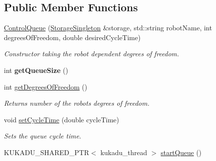 \subsection*{Public Member Functions}
\begin{DoxyCompactItemize}
\item 
\hyperlink{classkukadu_1_1ControlQueue_ae9c6ce0ac682b36829f892d8c3e44977}{Control\+Queue} (\hyperlink{classkukadu_1_1StorageSingleton}{Storage\+Singleton} \&storage, std\+::string robot\+Name, int degrees\+Of\+Freedom, double desired\+Cycle\+Time)
\begin{DoxyCompactList}\small\item\em Constructor taking the robot dependent degrees of freedom. \end{DoxyCompactList}\item 
int {\bfseries get\+Queue\+Size} ()\hypertarget{classkukadu_1_1ControlQueue_a90e78528f686215996715d225c6c4804}{}\label{classkukadu_1_1ControlQueue_a90e78528f686215996715d225c6c4804}

\item 
int \hyperlink{classkukadu_1_1ControlQueue_a809f7cfd97038949139e3b13218738ad}{get\+Degrees\+Of\+Freedom} ()
\begin{DoxyCompactList}\small\item\em Returns number of the robots degrees of freedom. \end{DoxyCompactList}\item 
void \hyperlink{classkukadu_1_1ControlQueue_a5245ff31c7dea26070743d1f6560801c}{set\+Cycle\+Time} (double cycle\+Time)
\begin{DoxyCompactList}\small\item\em Sets the queue cycle time. \end{DoxyCompactList}\item 
K\+U\+K\+A\+D\+U\+\_\+\+S\+H\+A\+R\+E\+D\+\_\+\+P\+TR$<$ kukadu\+\_\+thread $>$ \hyperlink{classkukadu_1_1ControlQueue_a35d6a6e4e7c8467691c11567fe21f340}{start\+Queue} ()\hypertarget{classkukadu_1_1ControlQueue_a35d6a6e4e7c8467691c11567fe21f340}{}\label{classkukadu_1_1ControlQueue_a35d6a6e4e7c8467691c11567fe21f340}


\end{DoxyCompactItemize}
